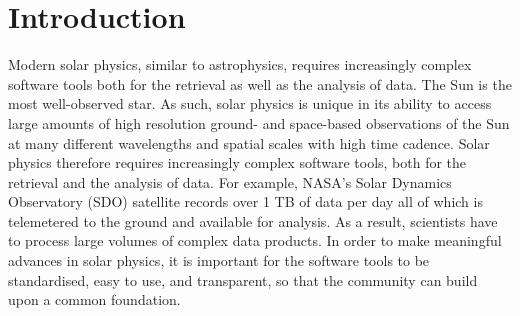 \section{Introduction}
Modern solar physics, similar to astrophysics, requires increasingly 
complex software tools both for the retrieval as well as the analysis 
of data. The Sun is the most well-observed star. As such, solar 
physics is unique in its ability to access large amounts of high 
resolution ground- and space-based observations of the Sun at many 
different wavelengths and spatial scales with high time cadence. 
Solar physics therefore requires
increasingly complex software tools, both for the retrieval and the 
analysis of data. For example, NASA's Solar Dynamics Observatory 
(SDO) satellite records over 1 TB of data per day all of which is 
telemetered to the ground and available for analysis. As a result, 
scientists have to process large volumes of complex data products. In 
order to make meaningful advances in solar physics, it is important 
for the software tools to be standardised, easy to use, and 
transparent, so that the community can build upon a common foundation.

